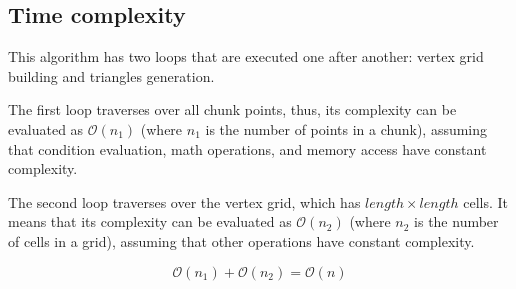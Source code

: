 \subsection{Time complexity}

This algorithm has two loops that are executed one after another: vertex grid building and triangles generation.

The first loop traverses over all chunk points, thus, its complexity can be evaluated as $\mathcal{O}(n_1)$ (where $n_1$ is the number of points in a chunk), assuming that condition evaluation, math operations, and memory access have constant complexity.

The second loop traverses over the vertex grid, which has $length \times length$ cells. It means that its complexity can be evaluated as $\mathcal{O}(n_2)$ (where $n_2$ is the number of cells in a grid), assuming that other operations have constant complexity.

$$\mathcal{O}(n_1) + \mathcal{O}(n_2) = \mathcal{O}(n)$$

